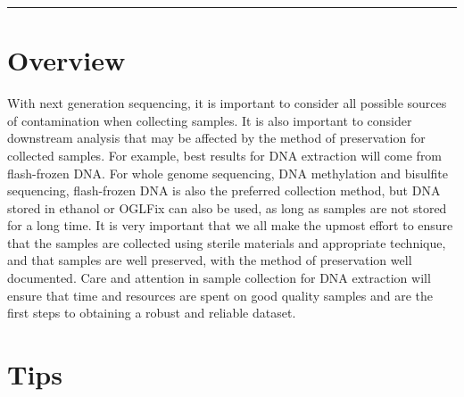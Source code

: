 \documentclass[
  letterpaper,
  DIV=11,
  numbers=noendperiod]{scrreprt}
\begin{document}
\begin{center}\rule{0.5\linewidth}{0.5pt}\end{center}

\hypertarget{overview-2}{%
\section*{\texorpdfstring{\textbf{Overview}}{Overview}}\label{overview-2}}


With next generation sequencing, it is important to consider all
possible sources of contamination when collecting samples. It is also
important to consider downstream analysis that may be affected by the
method of preservation for collected samples. For example, best results
for DNA extraction will come from flash-frozen DNA. For whole genome
sequencing, DNA methylation and bisulfite sequencing, flash-frozen DNA
is also the preferred collection method, but DNA stored in ethanol or
OGLFix can also be used, as long as samples are not stored for a long
time. It is very important that we all make the upmost effort to ensure
that the samples are collected using sterile materials and appropriate
technique, and that samples are well preserved, with the method of
preservation well documented. Care and attention in sample collection
for DNA extraction will ensure that time and resources are spent on good
quality samples and are the first steps to obtaining a robust and
reliable dataset.

\hypertarget{tips}{%
\section*{\texorpdfstring{\textbf{Tips}}{Tips}}\label{tips}}

\end{document}
